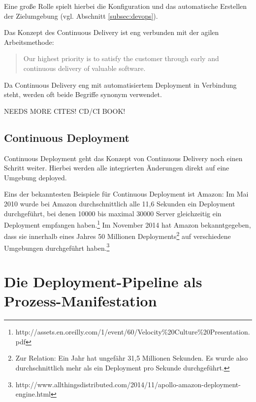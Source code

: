 Eine große Rolle spielt hierbei die Konfiguration und das automatische Erstellen der Zielumgebung (vgl. Abschnitt \ref{subsec:devops}).

Das Konzept des Continuous Delivery ist eng verbunden mit der agilen Arbeitsmethode:

\begin{quote}
  Our highest priority is to satisfy the customer through early and continuous delivery of valuable software.
\end{quote}

Da Continuous Delivery eng mit automatisiertem Deployment in Verbindung steht, werden oft beide Begriffe synonym verwendet.

{\draft NEEDS MORE CITES! CD/CI BOOK!}


\subsection{Continuous Deployment}

Continuous Deployment geht das Konzept von Continuous Delivery noch einen Schritt weiter. Hierbei werden alle integrierten Änderungen direkt auf eine Umgebung deployed.

Eins der bekanntesten Beispiele für Continuous Deployment ist Amazon: Im Mai 2010 wurde bei Amazon durchschnittlich alle 11,6 Sekunden ein Deployment durchgeführt, bei denen 10000 bis maximal 30000 Server gleichzeitig ein Deployment empfangen haben.\footnote{http://assets.en.oreilly.com/1/event/60/Velocity\%20Culture\%20Presentation.pdf} Im November 2014 hat Amazon bekanntgegeben, dass sie innerhalb eines Jahres 50 Millionen Deployments\footnote{Zur Relation: Ein Jahr hat ungefähr 31,5 Millionen Sekunden. Es wurde also durchschnittlich mehr als ein Deployment pro Sekunde durchgeführt.} auf verschiedene Umgebungen durchgeführt haben.\footnote{http://www.allthingsdistributed.com/2014/11/apollo-amazon-deployment-engine.html}

\section{Die Deployment-Pipeline als Prozess-Manifestation}
\label{sec:deployment-pipeline}
